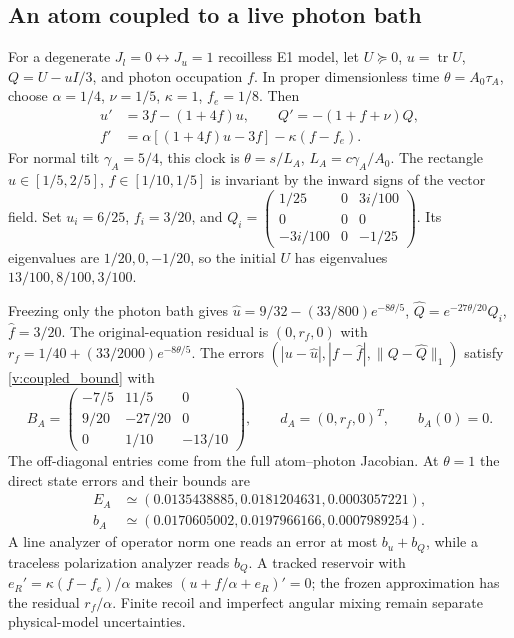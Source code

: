 \subsection{An atom coupled to a live photon bath}
For a degenerate $J_l=0\leftrightarrow J_u=1$ recoilless E1 model, let $U\succeq0$, $u=\operatorname{tr}U$, $Q=U-uI/3$, and photon occupation $f$. In proper dimensionless time $\theta=A_0\tau_A$, choose $\alpha=1/4$, $\nu=1/5$, $\kappa=1$, $f_e=1/8$. Then
\begin{align}
 u'&=3f-(1+4f)u,\qquad Q'=-(1+f+\nu)Q,\nonumber\\
 f'&=\alpha[(1+4f)u-3f]-\kappa(f-f_e).
 \label{v:atom_model}
\end{align}
For normal tilt $\gamma_A=5/4$, this clock is $\theta=s/L_A$, $L_A=c\gamma_A/A_0$. The rectangle $u\in[1/5,2/5]$, $f\in[1/10,1/5]$ is invariant by the inward signs of the vector field. Set $u_i=6/25$, $f_i=3/20$, and
$Q_i=\left(\begin{smallmatrix}1/25&0&3i/100\\0&0&0\\-3i/100&0&-1/25\end{smallmatrix}\right)$.
Its eigenvalues are $1/20,0,-1/20$, so the initial $U$ has eigenvalues $13/100,8/100,3/100$.

Freezing only the photon bath gives
$\widehat u=9/32-(33/800)e^{-8\theta/5}$,
$\widehat Q=e^{-27\theta/20}Q_i$, $\widehat f=3/20$.
The original-equation residual is $(0,r_f,0)$ with $r_f=1/40+(33/2000)e^{-8\theta/5}$. The errors $(|u-\widehat u|,|f-\widehat f|,\|Q-\widehat Q\|_1)$ satisfy \eqref{v:coupled_bound} with
\begin{equation}
 B_A=\begin{pmatrix}-7/5&11/5&0\\9/20&-27/20&0\\0&1/10&-13/10\end{pmatrix},
 \qquad d_A=(0,r_f,0)^T,\qquad b_A(0)=0 .
 \label{v:atom_bound}
\end{equation}
The off-diagonal entries come from the full atom--photon Jacobian. At $\theta=1$ the direct state errors and their bounds are
\begin{align}
 E_A&\simeq(0.0135438885,0.0181204631,0.0003057221),\nonumber\\
 b_A&\simeq(0.0170605002,0.0197966166,0.0007989254).
 \label{v:atom_errors}
\end{align}
A line analyzer of operator norm one reads an error at most $b_u+b_Q$, while a traceless polarization analyzer reads $b_Q$. A tracked reservoir with $e_R'=\kappa(f-f_e)/\alpha$ makes $(u+f/\alpha+e_R)'=0$; the frozen approximation has the residual $r_f/\alpha$. Finite recoil and imperfect angular mixing remain separate physical-model uncertainties.

